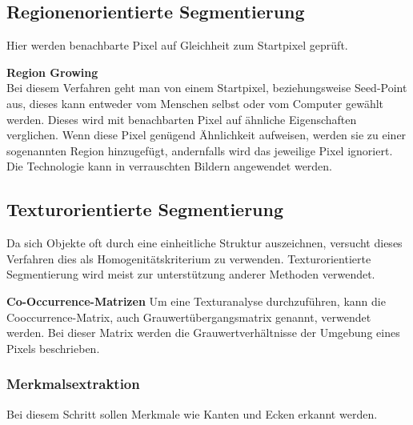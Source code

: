     \subsection*{Regionenorientierte Segmentierung}
    Hier werden benachbarte Pixel auf Gleichheit zum Startpixel geprüft. \cite{Seg_region}

    \textbf{Region Growing}\\
    Bei diesem Verfahren geht man von einem Startpixel, beziehungsweise Seed-Point aus, dieses kann entweder vom Menschen selbst oder vom Computer gewählt werden. Dieses wird mit benachbarten Pixel auf ähnliche Eigenschaften verglichen. Wenn diese Pixel genügend Ähnlichkeit aufweisen, werden sie zu einer sogenannten Region hinzugefügt, andernfalls wird das jeweilige Pixel ignoriert. Die Technologie kann in verrauschten Bildern angewendet werden.

    \subsection*{Texturorientierte Segmentierung}
    Da sich Objekte oft durch eine einheitliche Struktur auszeichnen, versucht dieses Verfahren dies als Homogenitätskriterium zu verwenden. Texturorientierte Segmentierung wird meist zur unterstützung anderer Methoden verwendet. \cite{Seg_textur}

    \textbf{Co-Occurrence-Matrizen}
    Um eine Texturanalyse durchzuführen, kann die Cooccurrence-Matrix, auch Grauwertübergangsmatrix genannt, verwendet werden. \cite{seg_coocc}
    Bei dieser Matrix werden die Grauwertverhältnisse der Umgebung eines Pixels beschrieben.

    \subsubsection{Merkmalsextraktion}
    Bei diesem Schritt sollen Merkmale wie Kanten und Ecken erkannt werden.

